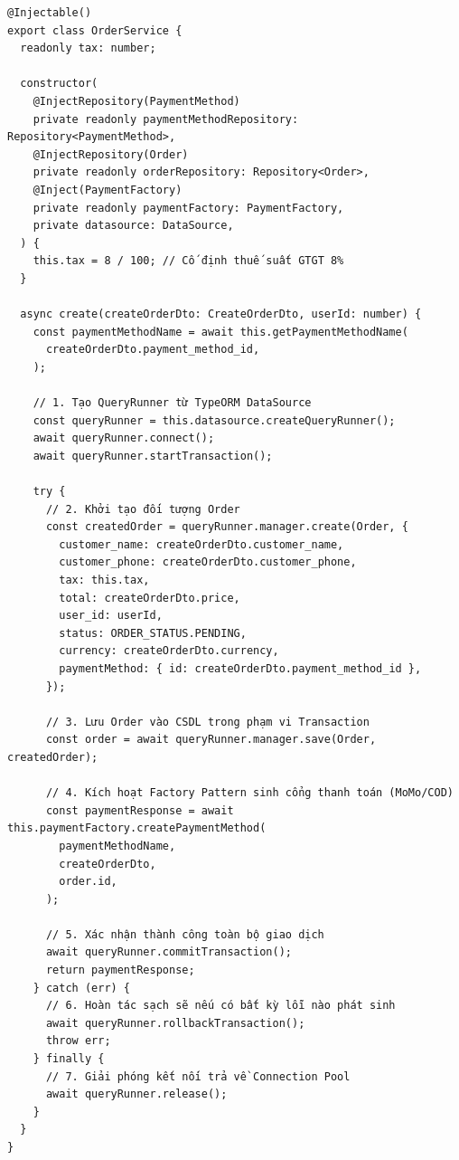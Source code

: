 \documentclass[12pt,a4paper,oneside]{book}
\begin{document}
\begin{codebox}
\begin{Verbatim}[fontsize=\small]
@Injectable()
export class OrderService {
  readonly tax: number;

  constructor(
    @InjectRepository(PaymentMethod)
    private readonly paymentMethodRepository: Repository<PaymentMethod>,
    @InjectRepository(Order)
    private readonly orderRepository: Repository<Order>,
    @Inject(PaymentFactory)
    private readonly paymentFactory: PaymentFactory,
    private datasource: DataSource,
  ) {
    this.tax = 8 / 100; // Cố định thuế suất GTGT 8%
  }

  async create(createOrderDto: CreateOrderDto, userId: number) {
    const paymentMethodName = await this.getPaymentMethodName(
      createOrderDto.payment_method_id,
    );

    // 1. Tạo QueryRunner từ TypeORM DataSource
    const queryRunner = this.datasource.createQueryRunner();
    await queryRunner.connect();
    await queryRunner.startTransaction();

    try {
      // 2. Khởi tạo đối tượng Order
      const createdOrder = queryRunner.manager.create(Order, {
        customer_name: createOrderDto.customer_name,
        customer_phone: createOrderDto.customer_phone,
        tax: this.tax,
        total: createOrderDto.price,
        user_id: userId,
        status: ORDER_STATUS.PENDING,
        currency: createOrderDto.currency,
        paymentMethod: { id: createOrderDto.payment_method_id },
      });

      // 3. Lưu Order vào CSDL trong phạm vi Transaction
      const order = await queryRunner.manager.save(Order, createdOrder);

      // 4. Kích hoạt Factory Pattern sinh cổng thanh toán (MoMo/COD)
      const paymentResponse = await this.paymentFactory.createPaymentMethod(
        paymentMethodName,
        createOrderDto,
        order.id,
      );

      // 5. Xác nhận thành công toàn bộ giao dịch
      await queryRunner.commitTransaction();
      return paymentResponse;
    } catch (err) {
      // 6. Hoàn tác sạch sẽ nếu có bất kỳ lỗi nào phát sinh
      await queryRunner.rollbackTransaction();
      throw err;
    } finally {
      // 7. Giải phóng kết nối trả về Connection Pool
      await queryRunner.release();
    }
  }
}
\end{Verbatim}
\end{codebox}
\end{document}
